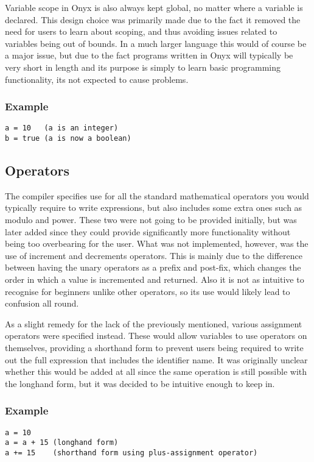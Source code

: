\documentclass[
]{report}
\begin{document}
Variable scope in Onyx is also always kept global, no matter where a
variable is declared. This design choice was primarily made due to the
fact it removed the need for users to learn about scoping, and thus
avoiding issues related to variables being out of bounds. In a much
larger language this would of course be a major issue, but due to the
fact programs written in Onyx will typically be very short in length and
its purpose is simply to learn basic programming functionality, its not
expected to cause problems.

\subsubsection{Example}
\begin{verbatim}
a = 10   (a is an integer)
b = true (a is now a boolean)
\end{verbatim}

\subsection{Operators}
The compiler specifies use for all the standard mathematical operators
you would typically require to write expressions, but also includes some
extra ones such as modulo and power. These two were not going to be
provided initially, but was later added since they could provide
significantly more functionality without being too overbearing for the
user. What was not implemented, however, was the use of increment and
decrements operators. This is mainly due to the difference between
having the unary operators as a prefix and post-fix, which changes the
order in which a value is incremented and returned. Also it is not as
intuitive to recognise for beginners unlike other operators, so its use
would likely lead to confusion all round.

As a slight remedy for the lack of the previously mentioned, various
assignment operators were specified instead. These would allow variables
to use operators on themselves, providing a shorthand form to prevent
users being required to write out the full expression that includes the
identifier name. It was originally unclear whether this would be added
at all since the same operation is still possible with the longhand
form, but it was decided to be intuitive enough to keep in.

\subsubsection{Example}
\begin{verbatim}
a = 10
a = a + 15 (longhand form)
a += 15    (shorthand form using plus-assignment operator)
\end{verbatim}
\end{document}

